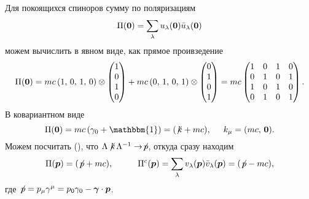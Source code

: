 

Для покоящихся спиноров сумму по поляризациям 
\begin{equation*}
	\Pi(\mbox{\boldmath $0$}) = \sum_\lambda u_\lambda(\mbox{\boldmath $0$}) \bar{u}_\lambda(\mbox{\boldmath $0$})
\end{equation*}
можем вычислить в явном виде, как прямое проивзедение
\begin{equation*}
	\Pi(\mbox{\boldmath $0$}) = mc \left(1,\, 0,\, 1,\, 0\right) \otimes \begin{pmatrix}
		1 \\ 0 \\ 1 \\ 0
	\end{pmatrix} + 
	mc \left(0,\, 1,\, 0,\, 1\right) \otimes \begin{pmatrix}
		0 \\ 1 \\ 0 \\ 1
	\end{pmatrix} = 
	mc \begin{pmatrix}
		1 & 0 & 1 & 0 \\
		0 & 1 & 0 & 1 \\
		1 & 0 & 1 & 0 \\
		0 & 1 & 0 & 1
	\end{pmatrix}.
\end{equation*}
В ковариантном виде
\begin{equation*}
	\Pi(\0) = mc \left(\gamma_0 + \mathbbm{1}\right) = (\not{\hspace{-1.2pt}k} + mc),
	\hspace{5 mm} 
	k_\mu = (mc,\, \0).
\end{equation*}
Можем посчитать  (), что $\Lambda \hspace{-1.2pt}\not{\hspace{-1.2pt}k}\hspace{1.2pt} \Lambda^{-1} \to \not{\hspace{-1.2pt}p}$, откуда сразу находим
\begin{equation*}
	\Pi(\vc{p}) = (\p + mc),
	\hspace{10 mm} 
	\Pi^c (\vc{p}) = \sum_\lambda v_\lambda(\vc{p}) \bar{v}_\lambda (\vc{p}) = (\p - mc),
\end{equation*}
где $\not{\hspace{-1.2pt}p} = p_\mu \gamma^\mu = p_0 \gamma_0 - \mbox{\boldmath $\gamma$} \cdot \mbox{\boldmath $p$}$.